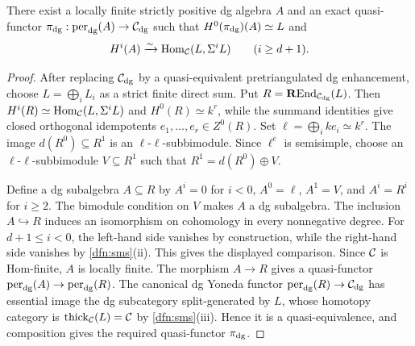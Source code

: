 \documentclass[11pt,a4paper,dvipsnames,x11names]{amsart}
\begin{document}
\begin{lem}\label{lem:construct-A}
There exist a locally finite strictly positive dg algebra $A$ and an exact quasi-functor $\pi_{\mathrm{dg}}:\operatorname{per}_{\mathrm{dg}}(A)\to\mathcal C_{\mathrm{dg}}$ such that $H^0(\pi_{\mathrm{dg}})(A)\simeq L$ and
\[
H^i(A)\xrightarrow{\sim}\operatorname{Hom}_{\mathcal C}(L,\Sigma^iL)\qquad(i\geq d+1).
\]
\end{lem}

\begin{proof}
After replacing $\mathcal C_{\mathrm{dg}}$ by a quasi-equivalent pretriangulated dg enhancement, choose $L=\bigoplus_iL_i$ as a strict finite direct sum. Put $R=\operatorname{\mathbf{R}End}_{\mathcal C_{\mathrm{dg}}}(L)$. Then $H^i(R)\simeq\operatorname{Hom}_{\mathcal C}(L,\Sigma^iL)$ and $H^0(R)\simeq k^r$, while the summand identities give closed orthogonal idempotents $e_1,\dots,e_r\in Z^0(R)$. Set $\ell=\bigoplus_i ke_i\simeq k^r$. The image $d(R^0)\subseteq R^1$ is an $\ell$-$\ell$-subbimodule. Since $\ell^e$ is semisimple, choose an $\ell$-$\ell$-subbimodule $V\subseteq R^1$ such that $R^1=d(R^0)\oplus V$.

Define a dg subalgebra $A\subseteq R$ by $A^i=0$ for $i<0$, $A^0=\ell$, $A^1=V$, and $A^i=R^i$ for $i\geq2$. The bimodule condition on $V$ makes $A$ a dg subalgebra. The inclusion $A\hookrightarrow R$ induces an isomorphism on cohomology in every nonnegative degree. For $d+1\leq i<0$, the left-hand side vanishes by construction, while the right-hand side vanishes by \cref{dfn:sms}(ii). This gives the displayed comparison. Since $\mathcal C$ is Hom-finite, $A$ is locally finite.
The morphism $A\to R$ gives a quasi-functor $\operatorname{per}_{\mathrm{dg}}(A)\to\operatorname{per}_{\mathrm{dg}}(R)$. The canonical dg Yoneda functor $\operatorname{per}_{\mathrm{dg}}(R)\to\mathcal C_{\mathrm{dg}}$ has essential image the dg subcategory split-generated by $L$, whose homotopy category is $\operatorname{thick}_{\mathcal C}(L)=\mathcal C$ by \cref{dfn:sms}(iii). Hence it is a quasi-equivalence, and composition gives the required quasi-functor $\pi_{\mathrm{dg}}$.
\end{proof}
\end{document}
